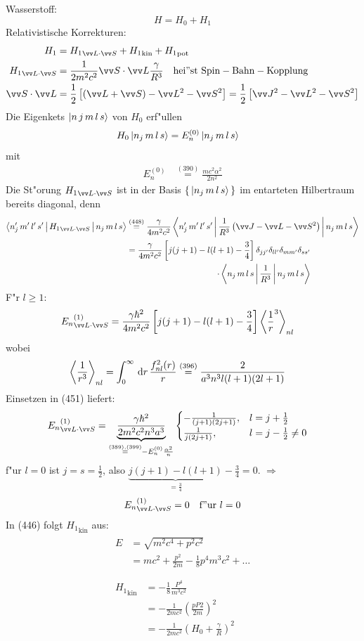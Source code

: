 \documentclass[a4paper]{scrartcl}
\newcommand{\dd}{\ensuremath \, \mathrm{d}}
\newcommand{\eqn}[1]{\begin{align} #1 \end{align}}
\newcommand{\eqnnon}[1]{\begin{align*} #1 \end{align*}}
\newcommand{\spl}[1]{\begin{split} #1 \end{split}}
\begin{document}
Wasserstoff:
$$H = H_0 + H_1$$
Relativistische Korrekturen:
\eqn{H_1 & = {H_1}_{\vv L \cdot  \vv S} + {H_1}_\mathrm{kin} + {H_1}_\mathrm{pot} \\
{H_1}_{\vv L \cdot \vv S} & = \frac1{2 m^2 c^2} \vv S \cdot \vv L \frac{ \gamma}{R^3} \quad \mathrm{hei"st \ Spin-Bahn-Kopplung} \\
\vv S \cdot \vv L & = \frac12 \left[ \left( \vv L + \vv S \right) - \vv L^2 - \vv S^2 \right] = \frac12 \left[ \vv J^2 - \vv L^2 - \vv S^2 \right]}
Die Eigenkets $\Ket{ n \, j \, m \, l \, s}$ von $H_0$ erf"ullen
\eqn{ H_0 \Ket{ n_j \, m \, l \, s} & = E_n^{(0)} \Ket{ n_j \, m \, l \, s}}
mit 
\eqnnon{E_n^{(0)} & \stackrel{(390)}= \frac{mc^2 \alpha^2}{2 n^2}}
Die St"orung ${H_1}_{\vv L \cdot \vv S}$ ist in der Basis $\set{ \Ket{ n_j \, m \, l \, s}}$ im entarteten Hilbertraum bereits diagonal, denn
\eqn{ \spl{
\Braket{ n_j' \, m' \, l' \, s' | {H_1}_{\vv L \cdot \vv S} | n_j \, m \, l \, s } & \stackrel{(448)}= \frac{\gamma}{4m^2c^2} \Braket{ n_j' \, m' \, l' \, s' | \frac1{R^3} \left( \vv J - \vv L - \vv S^2 \right) | n_j \, m \, l \, s } \\
& = \begin{aligned}[t]
\frac{ \gamma}{4 m^2 c^2} \left[ j(j+1) - l(l+1) - \frac34 \right] \delta_{jj'} \delta_{ll'} \delta_{mm'} \delta_{ss'} \\ \cdot\Braket{ n_j \, m \, l \, s | \frac1{R^3} | n_j \, m \, l \, s}
\end{aligned}
}}
F"r $l\geq 1$:
\eqn{{E_n}_{\vv L \cdot \vv S}^{(1)} & = \frac{ \gamma \hbar^2}{4 m^2 c^2 }\left[ j(j+1) - l(l+1) - \frac34 \right] \Braket{ \frac 1 r^3}_{nl}}
wobei
\eqn{
\Braket{ \frac1{r^3} }_{nl} & = \int_0^\infty \dd r \, \frac{f_{nl}^2(r)}{r} \stackrel{(396)} = \frac 2{a^3 n^3 l (l+1) (2l+1)}
}
Einsetzen in (451) liefert:
\eqn{
{E_n}_{\vv L \cdot \vv S}^{(1)} & = \underbrace{ \frac{ \gamma \hbar^2}{2 m^2 c^2 n^3 a^3}}_{\stackrel{(389),(399)}= -E_n^{(0)} \frac{\alpha^2}n} 
\begin{cases}
- \frac1{(j+1)(2j+1)}, & l=j+\frac12 \\
\frac1{j(2j+1)}, & l=j-\frac12 \neq 0
\end{cases}
}
f"ur $l=0$ ist $j=s=\frac12$, also $\underbrace{ j(j+1) - l(l+1)}_{=\frac34} - \frac34 = 0$. $\Longrightarrow$
\eqn{ {E_n}_{\vv L \cdot \vv S}^{(1)} = 0 \quad \mathrm{f"ur \ } l=0}
In (446) folgt ${H_1}_\mathrm{kin}$ aus:
\eqn{
\spl{
E & = \sqrt{m^2 c^4 + p^2 c^2} \\
& = mc^2 + \frac {p^2}{2m} - \frac18 {p^4}{m^3c^2} + \ldots \\
}  \\
\spl{
{H_1}_\mathrm{kin} & = - \frac18 \frac{P^4}{m^3c^2} \\
& = -\frac1{2mc^2} \left( \frac{pP2}{2m} \right)^2 \\
& = - \frac1{2mc^2} \left( H_0  + \frac \gamma R \right)^2
}
}
\end{document}
